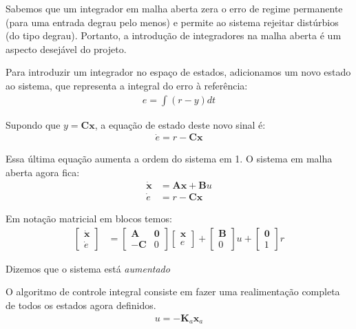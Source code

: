 \documentclass[
]{book}
\begin{document}
Sabemos que um integrador em malha aberta zera o erro de regime
permanente (para uma entrada degrau pelo menos) e permite ao sistema
rejeitar distúrbios (do tipo degrau). Portanto, a introdução de
integradores na malha aberta é um aspecto desejável do projeto.

Para introduzir um integrador no espaço de estados, adicionamos um novo
estado ao sistema, que representa a integral do erro à referência: \[
\begin{align*}
    {e} = \int (r-y)dt
\end{align*}
\]

Supondo que \(y=\mathbf{Cx}\), a equação de estado deste novo sinal é: \[
\begin{align*}
    \dot{e} = r-\mathbf{Cx}
\end{align*}
\]

Essa última equação aumenta a ordem do sistema em 1. O sistema em malha
aberta agora fica: \[
\begin{align*}
    \dot{\mathbf{x}} &= \mathbf{Ax}+\mathbf{B}u\\
    \dot{e} &= r-\mathbf{Cx}
\end{align*}
\]

Em notação matricial em blocos temos: \[
\begin{align*}
    \left[\begin{array}{c}\dot{\mathbf{x}}\\ \dot{e}\end{array}\right]&=
    \left[\begin{array}{cc}\mathbf{A} & \mathbf{0}\\-\mathbf{C} & 0\end{array}\right]\left[\begin{array}{c}{\mathbf{x}}\\ {e}\end{array}\right]+\left[\begin{array}{c}\mathbf{B}\\ 0\end{array}\right]u+\left[\begin{array}{c}\mathbf{0}\\ 1\end{array}\right]r
\end{align*}
\]

Dizemos que o sistema está \emph{aumentado}

O algoritmo de controle integral consiste em fazer uma realimentação
completa de todos os estados agora definidos. \[
\begin{align*}
    u = -\mathbf{K}_a\mathbf{x}_a
\end{align*}
\]
\end{document}
